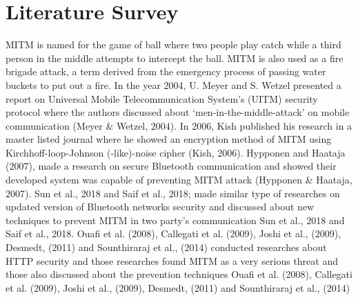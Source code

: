 \documentclass[11pt]{article}
\begin{document}
\section{Literature Survey}
MITM is named for the game of ball where two people play catch while a third person in the middle attempts
to intercept the ball. MITM is also used as a fire brigade attack, a term derived from the emergency
process of passing water buckets to put out a fire. In the year 2004, U. Meyer and S. Wetzel presented a
report on Universal Mobile Telecommunication System’s (UITM) security protocol where the authors discussed about ‘men-in-the-middle-attack’ on mobile communication (Meyer & Wetzel, 2004)\citep{meyer2004man}. In 2006,
Kish published his research in a master listed journal where he showed an encryption method of MITM
using Kirchhoff-loop-Johnson (-like)-noise cipher (Kish, 2006)\citep{kish2006protection}. Hypponen and Haataja (2007)\citep{hypponen2007nino}, made a research on secure Bluetooth communication and showed their developed system was capable of preventing MITM attack (Hypponen & Haataja, 2007). Sun et al., 2018 \citep{sun2018man}and Saif et al., 2018\citep{saif2018implementation}; made similar
type of researches on updated version of Bluetooth networks security and discussed about new techniques
to prevent MITM in two party’s communication Sun et al., 2018 \citep{sun2018man}and Saif et al., 2018\citep{saif2018implementation}. Ouafi et al. (2008)\citep{ouafi2008security},
Callegati et al. (2009)\citep{callegati2009man}, Joshi et al., (2009)\citep{joshi2009mitigating}, Desmedt, (2011)\citep{desmedt2011man} and Sounthiraraj et al., (2014)\citep{sounthiraraj2014smv} conducted
researches about HTTP security and those researches found MITM as a very serious threat and those also
discussed about the prevention techniques Ouafi et al. (2008)\citep{ouafi2008security},
Callegati et al. (2009)\citep{callegati2009man}, Joshi et al., (2009)\citep{joshi2009mitigating}, Desmedt, (2011)\citep{desmedt2011man} and Sounthiraraj et al., (2014)\citep{sounthiraraj2014smv} 
\end{document}
